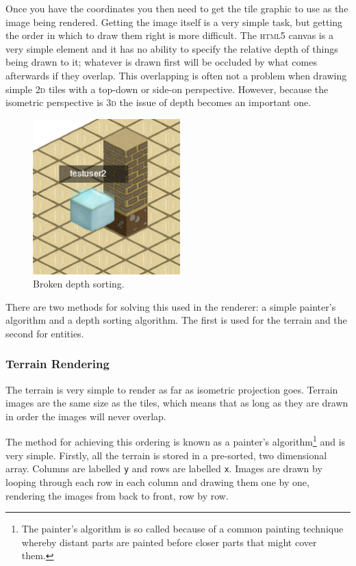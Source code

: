Once you have the coordinates you then need to get the tile graphic to use as the image being rendered. Getting the image itself is a very simple task, but getting the order in which to draw them right is more difficult. The \textsc{html5} canvas is a very simple element and it has no ability to specify the relative depth of things being drawn to it; whatever is drawn first will be occluded by what comes afterwards if they overlap. This overlapping is often not a problem when drawing simple \textsc{2d} tiles with a top-down or side-on perspective. However, because the isometric perspective is \textsc{3d} the issue of depth becomes an important one.

\begin{figure}[H]
    \centering
    \includegraphics[height=6cm]{Images/broken_depthsort.png}
    \caption{Broken depth sorting.}
    \label{fig:broken_depthsort}
\end{figure}


There are two methods for solving this used in the renderer: a simple painter's algorithm and a depth sorting algorithm. The first is used for the terrain and the second for entities.

\subsubsection{Terrain Rendering}
The terrain is very simple to render as far as isometric projection goes. Terrain images are the same size as the tiles, which means that as long as they are drawn in order the images will never overlap.

The method for achieving this ordering is known as a painter's algorithm\footnote{The painter's algorithm is so called because of a common painting technique whereby distant parts are painted before closer parts that might cover them.} and is very simple. Firstly, all the terrain is stored in a pre-sorted, two dimensional array. Columns are labelled \texttt{y} and rows are labelled \texttt{x}. Images are drawn by looping through each row in each column and drawing them one by one, rendering the images from back to front, row by row.

